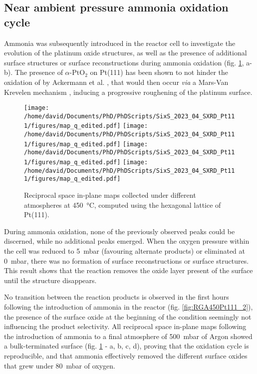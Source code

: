 \subsection{Near ambient pressure ammonia oxidation cycle}

Ammonia was subsequently introduced in the reactor cell to investigate the evolution of the platinum oxide structures, as well as the presence of additional surface structures or surface reconstructions during ammonia oxidation (fig. \ref{fig:MapsPt111B}, a-b).
The presence of $\alpha$-PtO$_2$ on Pt(111) has been shown to not hinder the oxidation of  by Ackermann et al. \parencite*{Ackermann2007}, that would then occur \textit{via} a Mars-Van Krevelen mechanism \parencite{Mars1954}, inducing a progressive roughening of the platinum surface.

\begin{figure}[!htb]
    \centering
    \texttt{[image: /home/david/Documents/PhD/PhDScripts/SixS\_2023\_04\_SXRD\_Pt111/figures/map\_q\_edited.pdf]}
    \texttt{[image: /home/david/Documents/PhD/PhDScripts/SixS\_2023\_04\_SXRD\_Pt111/figures/map\_q\_edited.pdf]}
    \texttt{[image: /home/david/Documents/PhD/PhDScripts/SixS\_2023\_04\_SXRD\_Pt111/figures/map\_q\_edited.pdf]}
    \texttt{[image: /home/david/Documents/PhD/PhDScripts/SixS\_2023\_04\_SXRD\_Pt111/figures/map\_q\_edited.pdf]}
    \caption{
        Reciprocal space in-plane maps collected under different atmospheres at \qty{450}{\degreeCelsius}, computed using the hexagonal lattice of Pt(111).
    }
    \label{fig:MapsPt111B}
\end{figure}

During ammonia oxidation, none of the previously observed peaks could be discerned, while no additional peaks emerged.
When the oxygen pressure within the cell was reduced to \qty{5}{\milli\bar} (favouring alternate products) or eliminated at \qty{0}{\milli\bar}, there was no formation of surface reconstructions or surface structures.
This result shows that the reaction removes the oxide layer present of the surface until the structure disappears.

No transition between the reaction products is observed in the first hours following the introduction of ammonia in the reactor (fig. \ref{fig:RGA450Pt111_2}), the presence of the surface oxide at the beginning of the condition seemingly not influencing the product selectivity.
All reciprocal space in-plane maps following the introduction of ammonia to a final atmosphere of \qty{500}{\milli\bar} of Argon showed a bulk-terminated surface (fig. \ref{fig:MapsPt111B} - a, b, c, d), proving that the oxidation cycle is reproducible, and that ammonia effectively removed the different surface oxides that grew under \qty{80}{\milli\bar} of oxygen.

